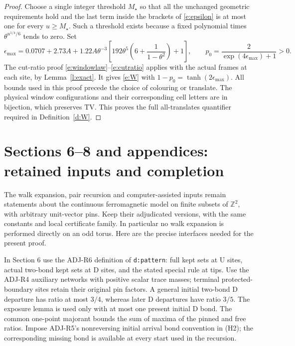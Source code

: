 \documentclass[11pt,reqno]{amsart}
\theoremstyle{definition}
\newcommand{\Z}{\mathbb Z}
\begin{document}
\begin{proof}
Choose a single integer threshold $M_\star$ so that all the unchanged
geometric requirements hold and the last term inside the brackets
of \eqref{e:epsilon} is at most one for every $u\ge M_\star$.
Such a threshold exists because a fixed polynomial times
$\theta^{u^{1/4}/6}$ tends to zero. Set
\begin{equation}\label{e:windowconstants}
 \epsilon_{\max}=0.0707+2.73A+
  1.22A\theta^{-3}\left[
       192\theta^5\left(6+\frac1{1-\theta^2}\right)+1\right],\qquad
 p_0=\frac2{\exp(4\epsilon_{\max})+1}>0.
\end{equation}
The cut-ratio proof \eqref{e:windowlaw}--\eqref{e:cutratio} applies
with the actual frames at each site, by Lemma~\ref{l:exact}.
It gives \eqref{e:W} with $1-p_0=\tanh(2\epsilon_{\max})$.
All bounds used in this proof precede the choice of colouring or
translate. The physical window configurations and their corresponding
cell letters are in bijection, which preserves TV. This proves the
full all-translates quantifier required in Definition~\ref{d:W}.
\end{proof}

\section{Sections 6--8 and appendices: retained inputs and completion}
\label{s:inputs}

The walk expansion, pair recursion and computer-assisted inputs remain
statements about the continuous ferromagnetic model on finite subsets
of $\Z^2$, with arbitrary unit-vector pins. Keep their adjudicated
versions, with the same constants and local certificate family.
In particular no walk expansion is performed directly on an odd torus.
Here are the precise interfaces needed for the present proof.

In Section 6 use the ADJ-R6 definition of \texttt{d:pattern}: full
kept sets at $\mathrm U$ sites, actual two-bond kept sets at
$\mathrm D$ sites, and the stated special rule at tips. Use the
ADJ-R4 auxiliary networks with positive scalar trace masses; terminal
protected-boundary sites retain their original pin factors. A general
initial two-bond $\mathrm D$ departure has ratio at most $3/4$,
whereas later $\mathrm D$ departures have ratio $3/5$. The exposure
lemma is used only with at most one present initial $\mathrm D$
bond. The common one-point majorant bounds the sum of maxima of the
pinned and free ratios. Impose ADJ-R5's nonreversing initial arrival
bond convention in (H2); the corresponding missing bond is available
at every start used in the recursion.
\end{document}
